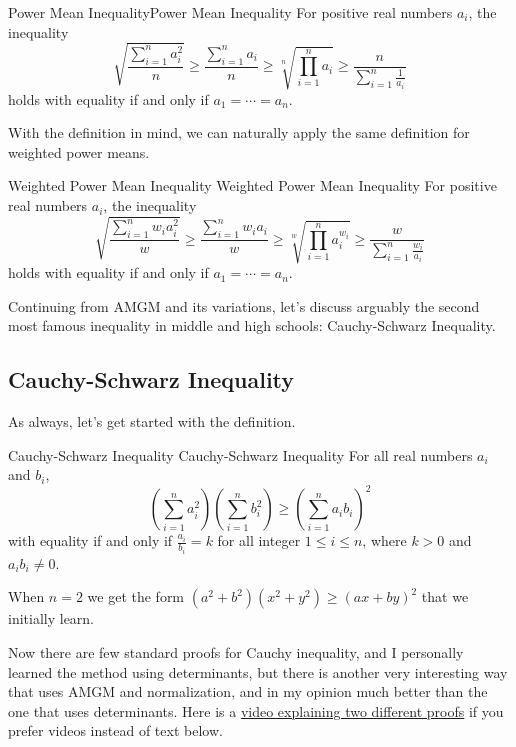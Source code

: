\documentclass[../../main.tex]{subfiles}
\begin{document}
\begin{definition}{Power Mean Inequality}{Power Mean Inequality}
For positive real numbers $a_i$, the inequality
\[
\sqrt{ \frac{\sum_{i=1}^n a_i^2}{n} }
\geq \frac{\sum_{i=1}^n a_i}{n}
\geq \sqrt[n]{\prod_{i=1}^n a_i}
\geq \frac{n}{ \sum_{i=1}^n \frac{1}{a_i} }
\]
holds with equality if and only if $a_1 = \cdots = a_n$.
\end{definition}

With the definition in mind, we can naturally apply the same
definition for weighted power means.

\begin{definition}
{Weighted Power Mean Inequality}
{Weighted Power Mean Inequality}
For positive real numbers $a_i$, the inequality
\[
\sqrt{ \frac{\sum_{i=1}^n w_i a_i^2}{w} }
\geq \frac{\sum_{i=1}^n w_i a_i}{w}
\geq \sqrt[w]{\prod_{i=1}^n a_i^{w_i}}
\geq \frac{w}{ \sum_{i=1}^n \frac{w_i}{a_i} }
\]
holds with equality if and only if $a_1 = \cdots = a_n$.
\end{definition}

Continuing from AMGM and its variations, let's discuss arguably the
second most famous inequality in middle and high schools:
Cauchy-Schwarz Inequality.

\subsection{Cauchy-Schwarz Inequality}

As always, let's get started with the definition.

\begin{definition}
{Cauchy-Schwarz Inequality}
{Cauchy-Schwarz Inequality}
For all real numbers $a_i$ and $b_i$,
\[
\left( \sum_{i=1}^n a_i^2 \right) \left( \sum_{i=1}^n b_i^2 \right)
\geq
\left( \sum_{i=1}^n a_i b_i \right)^2
\]
with equality if and only if $\frac{a_i}{b_i} = k$ for all integer
$1 \leq i \leq n$, where $k > 0$ and $a_ib_i \neq 0$.
\end{definition}

When $n = 2$ we get the form $(a^2 + b^2)(x^2 + y^2) \geq (ax + by)^2$
that we initially learn.

Now there are few standard proofs for Cauchy inequality,
and I personally learned the method using determinants,
but there is another very interesting way that uses AMGM and
normalization, and in my opinion much better than the one that
uses determinants. Here is a \href{https://youtu.be/OLUunhebpSg}
{video explaining two different proofs} if you prefer videos
instead of text below.
\end{document}
